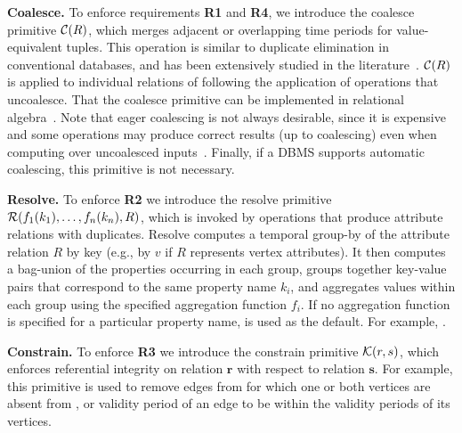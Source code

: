 {\bf Coalesce.} To enforce requirements {\bf R1} and {\bf R4}, we
introduce the coalesce primitive $\mathcal{C}(R)$, which merges adjacent or
overlapping time periods for value-equivalent tuples.  This operation
is similar to duplicate elimination in conventional databases, and has
been extensively studied in the
literature~\cite{DBLP:conf/vldb/BohlenSS96,DBLP:journals/sigmod/Zimanyi06}.
$\mathcal{C}(R)$ is applied to individual relations of \tve following the
application of operations that uncoalesce.  That the coalesce
primitive can be implemented in relational
algebra~\cite{DBLP:conf/vldb/BohlenSS96}.  Note that eager coalescing
is not always desirable, since it is expensive and some operations may
produce correct results (up to coalescing) even when computing over
uncoalesced inputs~\cite{DBLP:reference/db/Bohlen09}.  Finally, if a
DBMS supports automatic coalescing, this primitive is not necessary.

{\bf Resolve.} To enforce {\bf R2} we introduce the resolve primitive
$\mathcal{R}(f_1(k_1), \ldots, f_n(k_n),R)$, which is invoked by
operations that produce attribute relations with duplicates.  Resolve
computes a temporal group-by of the attribute relation $R$ by key
(e.g., by $v$ if $R$ represents vertex attributes).  It then computes
a bag-union of the properties occurring in each group, groups together
key-value pairs that correspond to the same property name $k_i$, and
aggregates values within each group using the specified aggregation
function $f_i$.  If no aggregation function is specified for a
particular property name,  is used as the default.  For
example, .

{\bf Constrain.} To enforce {\bf R3} we introduce the constrain
primitive $\mathcal{K}(r,s)$, which enforces referential integrity on
relation $\mathbf{r}$ with respect to relation $\mathbf{s}$.  For
example, this primitive is used to remove edges from \te for which one
or both vertices are absent from \tv, or validity period of an edge to
be within the validity periods of its vertices.



